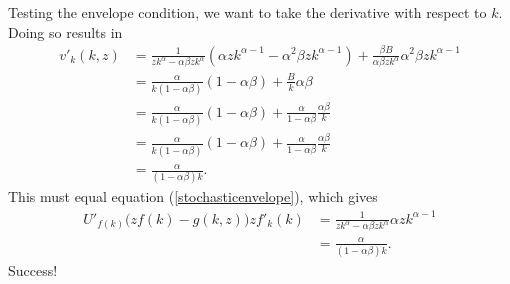\documentclass[12pt]{article}
\theoremstyle{definition}
\begin{document}
Testing the envelope condition, we want to take the derivative with respect to $k$. Doing so results in
\begin{align*}
	v'_k(k,z) &= \frac{1}{z k^{\alpha} - \alpha \beta zk^{\alpha}}(\alpha zk^{\alpha - 1} - \alpha^2 \beta zk^{\alpha - 1})	+ \frac{\beta B}{\alpha \beta zk^{\alpha}} \alpha^2 \beta zk^{\alpha - 1} \\
	& = \frac{\alpha}{ k(1 - \alpha \beta)}(1  - \alpha \beta )	+ \frac{ B}{k} \alpha \beta\\
	& = \frac{\alpha}{ k(1 - \alpha \beta)}(1  - \alpha \beta )	+  \frac{\alpha}{ 1- \alpha \beta }\frac{ \alpha \beta}{k}\\
	& = \frac{\alpha}{ k(1 - \alpha \beta)}(1  - \alpha \beta )	+  \frac{\alpha}{ 1- \alpha \beta }\frac{ \alpha \beta}{k}\\
	&= \frac{\alpha}{(1 - \alpha \beta)k}.
\end{align*}
This must equal equation (\ref{stochasticenvelope}), which gives
\begin{align*}
	U'_{f(k)}\big(zf(k) - g(k,z) \big)zf'_k(k) &= \frac{1}{zk^{\alpha} -  \alpha \beta zk^{\alpha}}\alpha zk^{\alpha - 1}\\
	 &= \frac{\alpha}{(1 -  \alpha \beta) k}.
\end{align*}
Success!

	
\end{document}
